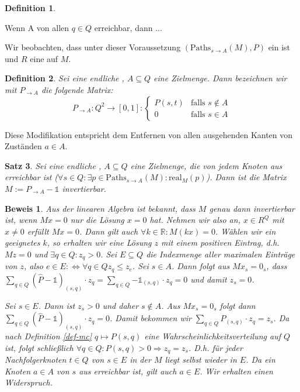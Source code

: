 \documentclass[a4paper]{article}
\newtheorem{satz}{Satz}[section] %
\newtheorem{definition}[satz]{Definition} %
\theoremstyle{nonumberplain}
\newtheorem{beweis}{Beweis}
\begin{document}
{\begin{definition}
\end{definition}

\begin{meta}
	 Wenn A von allen $q \in Q$ erreichbar, dann ...
\end{meta}

Wir beobachten, dass unter dieser Voraussetzung $(\mathrm{Paths}_{s \rightarrow A}(M), P)$ ein \probspace{} ist und $R$ eine \rvar{} auf $M$.

\begin{definition}\label{def-pmod}
	Sei \mcex{} eine endliche \mc, $A\subseteq Q$ eine Zielmenge. Dann bezeichnen wir mit $P_{\rightarrow A}$ die folgende Matrix:
	\begin{equation}
	P_{\rightarrow A} : Q^2 \to [0,1] : \begin{cases}
	P(s,t) & \text{falls } s\notin A\\
	0 & \text{falls } s\in A
	\end{cases}
	\end{equation}
\end{definition}

Diese Modifikation entspricht dem Entfernen von allen ausgehenden Kanten von Zuständen $a\in A$.

\begin{satz}\label{th-unique}
	Sei \mcex{} eine endliche \mc, $A\subseteq Q$ eine Zielmenge, die von jedem Knoten aus erreichbar ist ($\forall s\in Q: \exists p \in \mathrm{Paths}_{s\rightarrow A}(M) : \mathrm{real}_M(p)$). 
	Dann ist die Matrix $M := P_{\rightarrow A} - \mathbb{1}$ invertierbar.
\end{satz}
\begin{beweis}
	Aus der linearen Algebra ist bekannt, dass $M$ genau dann invertierbar ist, wenn $Mx = 0$ nur die Lösung $x=0$ hat.
	Nehmen wir also an, $x \in R^Q$ mit $x\neq 0$ erfüllt $Mx = 0$. Dann gilt auch $\forall k \in \mathbb{R}: M (kx) = 0$. Wählen wir ein geeignetes $k$, so erhalten wir eine Lösung $z$ mit einem positiven Eintrag, d.h. $Mz = 0$ und $\exists q \in Q : z_q > 0$. Sei $E \subseteq Q$ die Indexmenge aller maximalen Einträge von $z$, also $e \in E :\Leftrightarrow \forall q \in Q z_q \leq z_e$. Sei $s\in A$. Dann folgt aus $Mx_s = 0_s$, dass $\sum_{q\in Q}{(\widehat{P}- \mathbb{1})_{(s,q)} \cdot z_q} = \sum_{q\in Q}{-\mathbb{1}_{(s,q)} \cdot z_q} = 0$  und damit $z_s = 0$.
	
	Sei $s \in E$. Dann ist $z_s > 0$ und daher $s\notin A$. Aus $Mx_s = 0_s$ folgt dann $\sum_{q\in Q}{(\widehat{P}- \mathbb{1})_{(s,q)} \cdot z_q} = 0$. Damit bekommen wir $\sum_{q\in Q}{P_{(s,q)} \cdot z_q} = z_s$. Da nach Definition \ref{def-mc} $q \mapsto P(s,q)$ eine Wahrscheinlichkeitsverteilung auf $Q$ ist, folgt schließlich $\forall q\in Q: P(s,q) > 0 \Rightarrow z_q = z_s$. D.h. für jeder Nachfolgerknoten $t\in Q$ von $s\in E$ in der \mc{} $M$ liegt selbst wieder in $E$. Da ein Knoten $a\in A$ von $s$ aus erreichbar ist, gilt auch $a\in E$. Wir erhalten einen Widerspruch.
\end{beweis}


}
\end{document}
